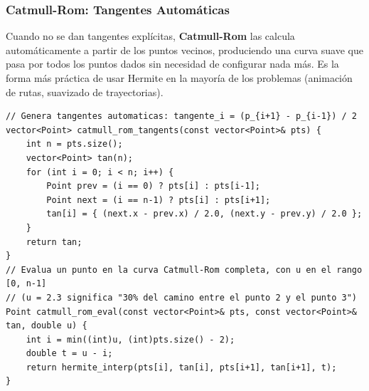 \documentclass[10pt,twocolumn,letterpaper]{report}
\begin{document}
\subsubsection{Catmull-Rom: Tangentes Automáticas}
Cuando no se dan tangentes explícitas, \textbf{Catmull-Rom} las calcula automáticamente a partir de los puntos vecinos, produciendo una curva suave que pasa por todos los puntos dados sin necesidad de configurar nada más. Es la forma más práctica de usar Hermite en la mayoría de los problemas (animación de rutas, suavizado de trayectorias).
\begin{lstlisting}
// Genera tangentes automaticas: tangente_i = (p_{i+1} - p_{i-1}) / 2
vector<Point> catmull_rom_tangents(const vector<Point>& pts) {
    int n = pts.size();
    vector<Point> tan(n);
    for (int i = 0; i < n; i++) {
        Point prev = (i == 0) ? pts[i] : pts[i-1];
        Point next = (i == n-1) ? pts[i] : pts[i+1];
        tan[i] = { (next.x - prev.x) / 2.0, (next.y - prev.y) / 2.0 };
    }
    return tan;
}
// Evalua un punto en la curva Catmull-Rom completa, con u en el rango [0, n-1]
// (u = 2.3 significa "30% del camino entre el punto 2 y el punto 3")
Point catmull_rom_eval(const vector<Point>& pts, const vector<Point>& tan, double u) {
    int i = min((int)u, (int)pts.size() - 2);
    double t = u - i;
    return hermite_interp(pts[i], tan[i], pts[i+1], tan[i+1], t);
}
\end{lstlisting}
\end{document}
